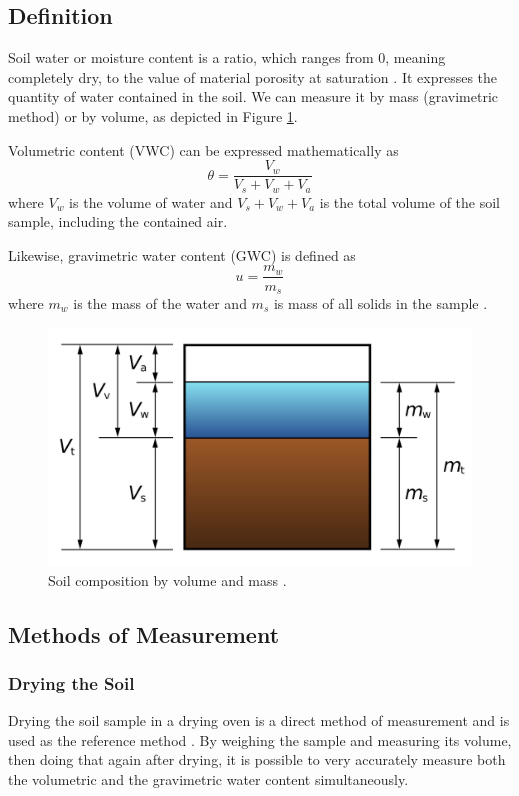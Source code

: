 \subsection{Definition}
Soil water or moisture content is a ratio, which ranges from 0, meaning completely dry, to the value of material porosity at saturation \cite{webster_humidity_1998}. It expresses the quantity of water contained in the soil. We can measure it by mass (gravimetric method) or by volume, as depicted in Figure \ref{fig:soil-phase-diagram}.

Volumetric content (VWC) can be expressed mathematically as
\begin{equation}
    \label{equation:volumetric-content} \theta = \dfrac{V_w}{V_s + V_w + V_a}
\end{equation}
where $V_w$ is the volume of water and $V_s + V_w + V_a$ is the total volume of the soil sample, including the contained air.

Likewise, gravimetric water content (GWC) is defined as
\begin{equation}
    \label{equation:gravimetric-content} u = \dfrac{m_w}{m_s}
\end{equation}
where $m_w$ is the mass of the water and $m_s$ is mass of all solids in the sample \cite{edaphic_scientific_pty_ltd_how_2024}.

\begin{figure}
    \includegraphics[width=.5\textwidth]{fig/soil-phase-diagram.png}
    \caption{\label{fig:soil-phase-diagram} Soil composition by volume and mass \cite{noauthor_water_2023}.}
\end{figure}

\subsection{Methods of Measurement}
\subsubsection{Drying the Soil}
Drying the soil sample in a drying oven is a direct method of measurement and is used as the reference method \cite{webster_humidity_1998}. By weighing the sample and measuring its volume, then doing that again after drying, it is possible to very accurately measure both the volumetric and the gravimetric water content simultaneously.

